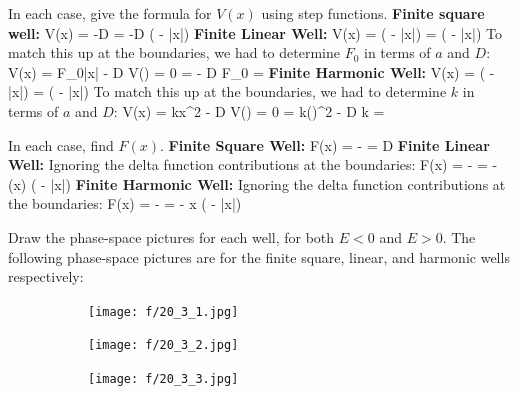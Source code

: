 \benu
\item In each case, give the formula for $V(x)$ using step functions. 
\newline \textbf{Finite square well:}
\be
V(x) = -D \times {} = -D \times \Theta\left( - \left|x\right|\right)
\ee
\textbf{Finite Linear Well:}
\be
V(x) =  \times \Theta\left( - \left|x\right|\right) =  \times \Theta\left( - \left|x\right|\right)
\ee
To match this up at the boundaries, we had to determine $F_0$ in terms of $a$ and $D$:
\be
V(x) = F_0\left|x\right| - D \thus V\left(\right) = 0 =  - D \thus F_0 = 
\ee
\textbf{Finite Harmonic Well:}
\be
V(x) =  \times \Theta\left( - \left|x\right|\right) =  \times \Theta\left( - \left|x\right|\right)
\ee
To match this up at the boundaries, we had to determine $k$ in terms of $a$ and $D$:
\be
V(x) = kx^2 - D \thus V\left(\right) = 0 = k\left(\right)^2 - D \thus k = 
\ee
\item In each case, find $F(x)$.
\newline \textbf{Finite Square Well:}
\be
F(x) = - = D \times {} 
\ee
\textbf{Finite Linear Well:} Ignoring the delta function contributions at the boundaries:
\be
F(x) = - = - (x) \times \Theta\left( - \left|x\right|\right)
\ee
\textbf{Finite Harmonic Well:} Ignoring the delta function contributions at the boundaries:
\be
F(x) = - = - x \times \Theta\left( - \left|x\right|\right)
\ee
\item Draw the phase-space pictures for each well, for both $E < 0$ and $E > 0$.
\newline The following phase-space pictures are for the finite square, linear, and harmonic wells respectively:
\begin{figure}[h!]
\begin{center}
\begin{subfigure}[h]{.26\textwidth}
    \begin{center}
    \texttt{[image: f/20\_3\_1.jpg]}
    \end{center}
\end{subfigure}
\begin{subfigure}[h]{.26\textwidth}
    \begin{center}
    \texttt{[image: f/20\_3\_2.jpg]}
    \end{center}
\end{subfigure}
\begin{subfigure}[h]{.28\textwidth}
    \begin{center}
    \texttt{[image: f/20\_3\_3.jpg]}
    \end{center}
\end{subfigure}
\end{center}
\end{figure}

